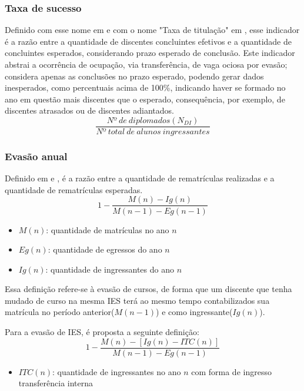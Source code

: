\documentclass{article}
\begin{document}
\subsubsection{Taxa de sucesso}
Definido com esse nome em \cite{indicadores_TCU} e com o nome "Taxa de titulação" em \cite{mudanca_calculos}, esse indicador é a razão entre a quantidade de discentes concluintes efetivos e a quantidade de concluintes esperados, considerando prazo esperado de conclusão.
Este indicador abstrai a ocorrência de ocupação, via transferência, de vaga ociosa por evasão; considera apenas as conclusões no prazo esperado, podendo gerar dados inesperados, como percentuais acima de 100\%, indicando haver se formado no ano em questão mais discentes que o esperado, consequência, por exemplo, de discentes atrasados ou de discentes adiantados.
\begin{equation}
\frac{Nº\ de\ diplomados(N_{DI})}{Nº\ total\ de\ alunos\ ingressantes}
\end{equation}

\subsubsection{Evasão anual}
Definido em \cite{esclarecimentos_calculos} e \cite{mudanca_calculos}, é a razão entre a quantidade de rematrículas realizadas e a quantidade de rematrículas esperadas.
\begin{equation}
1 - \frac{M(n) - Ig(n)}{M(n-1) - Eg(n-1)}
\end{equation}
\begin{itemize}
\item $M(n)$: quantidade de matrículas no ano $n$
\item $Eg(n)$: quantidade de egressos do ano $n$
\item $Ig(n)$: quantidade de ingressantes do ano $n$
\end{itemize}

Essa definição refere-se à evasão de cursos, de forma que um discente que tenha mudado de curso na mesma IES terá ao mesmo tempo contabilizados sua matrícula no período anterior($M(n-1)$) e como ingressante($Ig(n)$).

Para a evasão de IES, é proposta a seguinte definição:
\begin{equation}
1 - \frac{M(n) - [Ig(n) - ITC(n)]}{M(n-1) - Eg(n-1)}
\end{equation}
\begin{itemize}
\item $ITC(n)$: quantidade de ingressantes no ano $n$ com forma de ingresso transferência interna
\end{itemize}
\end{document}
